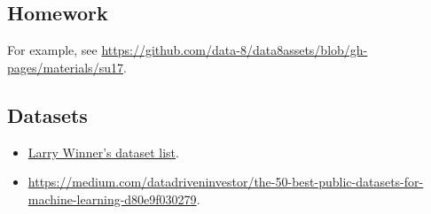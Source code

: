 \hypertarget{homework}{%
\subsection{Homework}\label{homework}}

For example, see
\url{https://github.com/data-8/data8assets/blob/gh-pages/materials/su17}.

\hypertarget{datasets}{%
\subsection{Datasets}\label{datasets}}

\begin{itemize}
\tightlist
\item
  \href{http://users.stat.ufl.edu/~winner/datasets.html}{Larry Winner's
  dataset list}.
\item
  \url{https://medium.com/datadriveninvestor/the-50-best-public-datasets-for-machine-learning-d80e9f030279}.
\end{itemize}
